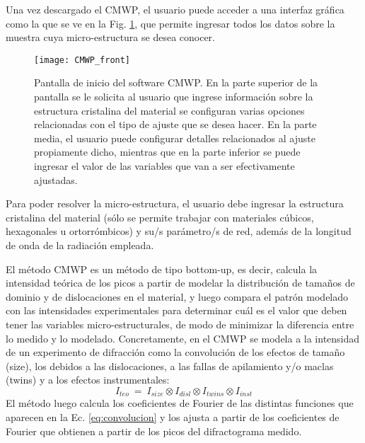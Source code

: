 Una vez descargado el CMWP, el usuario puede acceder a una interfaz gráfica como la que se ve en la Fig. \ref{fig:CMWP_front}, que permite ingresar todos los datos sobre la muestra cuya micro-estructura se desea conocer.
\begin{figure}[!htb]
  \centering
  \texttt{[image: CMWP\_front]}
  \caption{Pantalla de inicio del software CMWP. En la parte superior de la pantalla se le solicita al usuario que ingrese información sobre la estructura cristalina del material se configuran varias opciones relacionadas con el tipo de ajuste que se desea hacer. En la parte media, el usuario puede configurar detalles relacionados al ajuste propiamente dicho, mientras que en la parte inferior se puede ingresar el valor de las variables que van a ser efectivamente ajustadas.}
  \label{fig:CMWP_front}
\end{figure}

Para poder resolver la micro-estructura, el usuario debe ingresar la estructura cristalina del material (sólo se permite trabajar con materiales cúbicos, hexagonales u ortorrómbicos) y su/s parámetro/s de red, además de la longitud de onda de la radiación empleada.

El método CMWP es un método de tipo bottom-up, es decir, calcula la intensidad teórica de los picos a partir de modelar la distribución de tamaños de dominio y de dislocaciones en el material, y luego compara el patrón modelado con las intensidades experimentales para determinar cuál es el valor que deben tener las variables micro-estructurales, de modo de minimizar la diferencia entre lo medido y lo modelado.
Concretamente, en el CMWP se modela a la intensidad de un experimento de difracción como la convolución de los efectos de tamaño (size), los debidos a las dislocaciones, a las fallas de apilamiento y/o maclas (twins) y a los efectos instrumentales:
\begin{equation}
  I_{teo} \ = \ I_{size} \otimes I_{disl} \otimes I_{twins} \otimes I_{inst}
  \label{eq:convolucion}
\end{equation}
\noindent
El método luego calcula los coeficientes de Fourier de las distintas funciones que aparecen en la Ec. \ref{eq:convolucion} y los ajusta a partir de los coeficientes de Fourier que obtienen a partir de los picos del difractograma medido.

